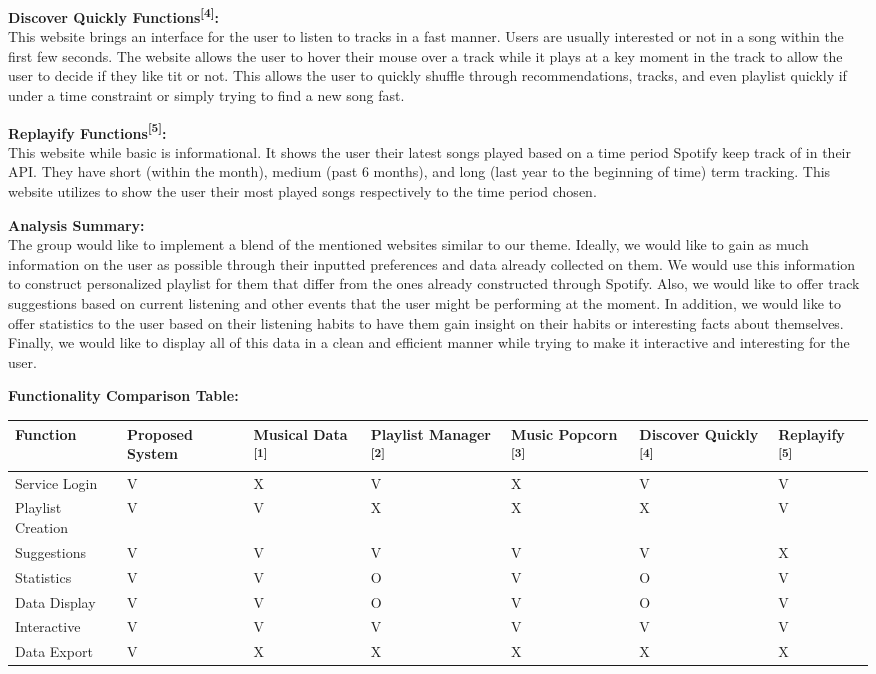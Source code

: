 \documentclass[letter, 11pt]{article}
\begin{document}
\noindent
\textbf{Discover Quickly Functions{\textsuperscript{[4]}}:}\\
This website brings an interface for the user to listen to tracks in a fast manner. Users are usually interested or not in a song within the first few seconds. The website allows the user to hover their mouse over a track while it plays at a key moment in the track to allow the user to decide if they like tit or not. This allows the user to quickly shuffle through recommendations, tracks, and even playlist quickly if under a time constraint or simply trying to find a new song fast.
\setlength{\parskip}{7pt}

\noindent
\textbf{Replayify Functions{\textsuperscript{[5]}}:}\\
This website while basic is informational. It shows the user their latest songs played based on a time period Spotify keep track of in their API. They have short (within the month), medium (past 6 months), and long (last year to the beginning of time) term tracking. This website utilizes to show the user their most played songs respectively to the time period chosen.
\setlength{\parskip}{7pt}


\noindent
\textbf{Analysis Summary:}\\
The group would like to implement a blend of the mentioned websites similar to our theme. Ideally, we would like to gain as much information on the user as possible through their inputted preferences and data already collected on them. We would use this information to construct personalized playlist for them that differ from the ones already constructed through Spotify. Also, we would like to offer track suggestions based on current listening and other events that the user might be performing at the moment. In addition, we would like to offer statistics to the user based on their listening habits to have them gain insight on their habits or interesting facts about themselves. Finally, we would like to display all of this data in a clean and efficient manner while trying to make it interactive and interesting for the user.
\setlength{\parskip}{7pt}

\noindent
\textbf{Functionality Comparison Table:}\\

\noindent
\begin{tabular}{ |p{3cm}|p{2cm}|p{2cm}|p{2cm}|p{2cm}|p{2cm}|p{2cm}|  }
 \hline
 Function & Proposed System & Musical Data \textsuperscript{[1]} & Playlist Manager \textsuperscript{[2]} & Music Popcorn \textsuperscript{[3]} & Discover Quickly
 \textsuperscript{[4]} & Replayify
 \textsuperscript{[5]}\\
 \hline
 Service Login & V & X & V & X & V & V\\
 Playlist Creation & V & V & X & X & X & V\\
 Suggestions & V & V & V & V & V & X\\
 Statistics & V & V & O & V & O & V\\
 Data Display & V & V & O & V & O & V\\
 Interactive & V & V & V & V & V & V\\
 Data Export & V & X & X & X & X & X\\
 \hline
\end{tabular}
\end{document}
